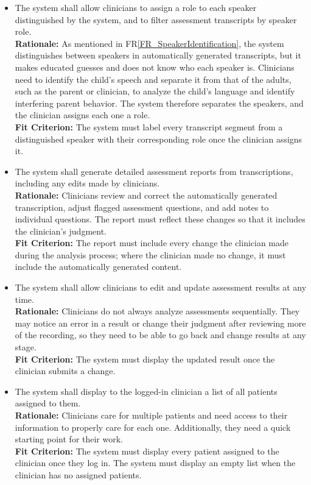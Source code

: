 \documentclass[12pt]{article}
\newcounter{reqnum} %
\newcommand{\rthereqnum}{FR\thereqnum}
\newcommand{\rref}[1]{FR\ref{#1}}
\begin{document}
\begin{itemize}
\item[\textbf{\rthereqnum} \label{FR_Label6}:] The system shall allow clinicians to assign a role to each speaker distinguished by the system, and to filter assessment transcripts by speaker role.
\\ \textbf{Rationale:} As mentioned in \rref{FR_SpeakerIdentification}, the system distinguishes between speakers in automatically generated transcripts, but it makes educated guesses and does not know who each speaker is. Clinicians need to identify the child's speech and separate it from that of the adults, such as the parent or clinician, to analyze the child's language and identify interfering parent behavior. The system therefore separates the speakers, and the clinician assigns each one a role.
\\ \textbf{Fit Criterion:} The system must label every transcript segment from a distinguished speaker with their corresponding role once the clinician assigns it.
\item[\textbf{\rthereqnum} \label{FR_Label7}:] The system shall generate detailed assessment reports from transcriptions, including any edits made by clinicians.
\\ \textbf{Rationale:} Clinicians review and correct the automatically generated transcription, adjust flagged assessment questions, and add notes to individual questions. The report must reflect these changes so that it includes the clinician’s judgment.
\\ \textbf{Fit Criterion:} The report must include every change the clinician made during the analysis process; where the clinician made no change, it must include the automatically generated content.

\item[\textbf{\rthereqnum} \label{FR_Label8}:] The system shall allow clinicians to edit and update assessment results at any time.
\\ \textbf{Rationale:} Clinicians do not always analyze assessments sequentially. They may notice an error in a result or change their judgment after reviewing more of the recording, so they need to be able to go back and change results at any stage. 
\\ \textbf{Fit Criterion:} The system must display the updated result once the clinician submits a change.

\item[\textbf{\rthereqnum} \label{FR_Label9}:] The system shall display to the logged-in clinician a list of all patients assigned to them.
\\ \textbf{Rationale:} Clinicians care for multiple patients and need access to their information to properly care for each one. Additionally, they need a quick starting point for their work. 
\\ \textbf{Fit Criterion:} The system must display every patient assigned to the clinician once they log in. The system must display an empty list when the clinician has no assigned patients.


\end{itemize}
\end{document}
